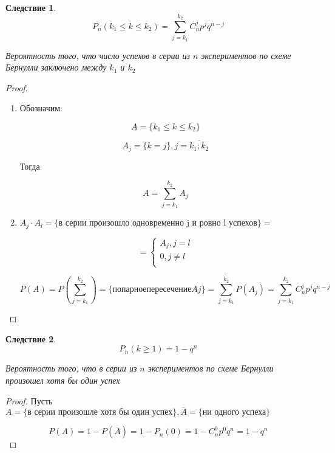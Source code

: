 \documentclass[a4paper, 14pt]{report}
\newtheorem{cont}{Следствие}[section]
\begin{document}
\begin{cont}
    $$
    P_n(k_1 \le k \le k_2) = \sum_{j=k_1}^{k_2} C_n^j p^j q^{n-j}
    $$

    Вероятность того, что число успехов в серии из $n$ экспериментов по схеме Бернулли заключено между $k_1$ и $k_2$
\end{cont}

\begin{proof}
    \hfill

    \begin{enumerate}
        \item Обозначим:

            $$
            A = \{ k_1 \le k \le k_2 \}
            $$

            $$
            A_j = \{ k = j \}, j = \overline{k_1;k_2}
            $$

            Тогда

            $$
            A = \sum_{j = k_1}^{k_2} A_j
            $$

        \item $A_j \cdot A_l = \{ \text{в серии произошло одновременно j и ровно l успехов} \} =$

            $$
            =
            \begin{cases}
                A_j, j=l \\
                0, j \ne l \\
            \end{cases}
            $$

            $$
            P(A) = P(\sum_{j=k_1}^{k_2}) = \{попарное пересечение Aj\} = \sum_{j=k_1}^{k_2} P(A_j) = \sum_{j=k_1}^{k_2} C_n^j p^j q^{n-j}
            $$
    \end{enumerate}
\end{proof}

\begin{cont}
    $$
    P_n(k \geq 1) = 1 - q^n
    $$

    Вероятность того, что в серии из $n$ экспериментов по схеме Бернулли произошел хотя бы один успех
\end{cont}

\begin{proof}
    Пусть $A = \{ \text{в серии произошле хотя бы один успех} \}, \overline A = \{ \text{ни одного успеха} \}$

    $$
    P(A) = 1 - P(\overline{A}) = 1 - P_n(0) = 1 - C_n^0 p^0 q^n = 1 - q^n
    $$
\end{proof}
\end{document}
